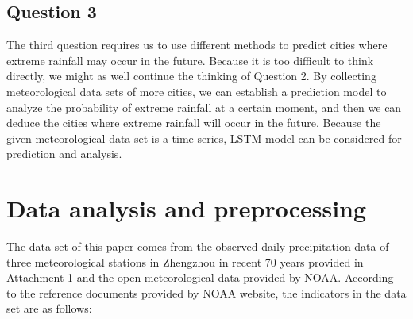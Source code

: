 \documentclass{swmcmthesis}
\begin{document}
\subsection{Question 3}
\hspace{1.25em}
The third question requires us to use different methods to predict cities where extreme rainfall may occur in the future. Because it is too difficult to think directly, we might as well continue the thinking of Question 2. By collecting meteorological data sets of more cities, we can establish a prediction model to analyze the probability of extreme rainfall at a certain moment, and then we can deduce the cities where extreme rainfall will occur in the future. Because the given meteorological data set is a time series, LSTM model can be considered for prediction and analysis.

\section{Data analysis and preprocessing}
\par
The data set of this paper comes from the observed daily precipitation data of three meteorological stations in Zhengzhou in recent 70 years provided in Attachment 1 and the open meteorological data provided by NOAA. According to the reference documents provided by NOAA website, the indicators in the data set are as follows:
\end{document}
